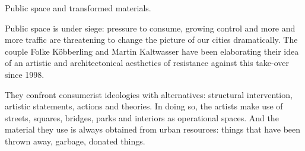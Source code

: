 \begin{itemize}
Public space and transformed materials. 

Public space is under siege: pressure to consume, growing control and more and more traffic are threatening to change the picture of our cities dramatically. The couple Folke Köbberling and Martin Kaltwasser have been elaborating their idea of an artistic and architectonical aesthetics of resistance against this take-over since 1998.

They confront consumerist ideologies with alternatives: structural intervention, artistic statements, actions and theories. In doing so, the artists make use of streets, squares, bridges, parks and interiors as operational spaces. And the material they use is always obtained from urban resources: things that have been thrown away, garbage, donated things.


\end{itemize}

